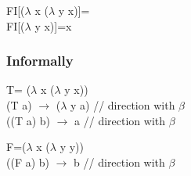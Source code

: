 \documentclass{article}
\begin{document}
\begin{flushleft}
FI[($\lambda$ x ($\lambda$ y x)]={}\\
FI[($\lambda$ y x)]={x}
\end{flushleft}


\begin{flushleft}
\subsubsection*{Informally}
T= ($\lambda$ x ($\lambda$ y x)) \\
(T a) $\rightarrow$ ($\lambda$ y a) // direction with $\beta$\\
((T a) b) $\rightarrow$ a // direction with $\beta$
\end{flushleft}

\begin{flushleft}
F=($\lambda$ x ($\lambda$ y y))\\
((F a) b) $\rightarrow$ b // direction with $\beta$
\end{flushleft}\
\end{document}
